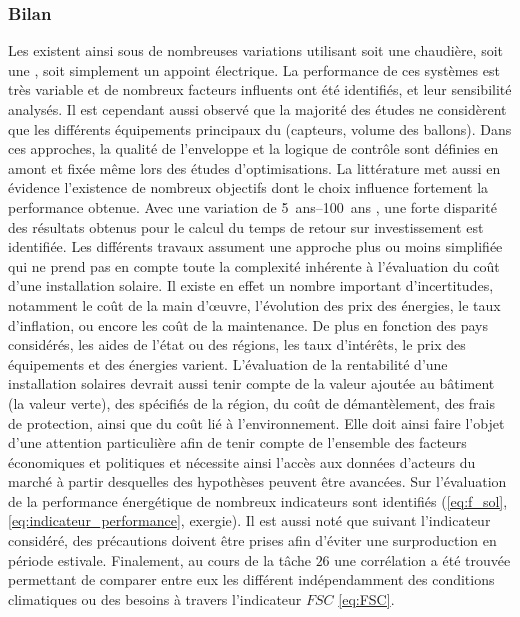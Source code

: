 \subsubsection{Bilan} %
\label{ssub:bilan_travaux}
Les  existent ainsi sous de nombreuses variations utilisant soit une chaudière,
soit une , soit simplement un appoint électrique. La performance de ces systèmes
est très variable et de nombreux facteurs influents ont été identifiés, et leur
sensibilité analysés. Il est cependant aussi observé que la majorité des études ne
considèrent que les différents équipements principaux du  (capteurs, volume des
ballons). Dans ces approches, la qualité de l’enveloppe et la logique de contrôle sont
définies en amont et fixée même lors des études d’optimisations. La littérature met aussi
en évidence l’existence de nombreux objectifs dont le choix influence fortement la
performance obtenue. Avec une variation de \SIrange{5}{100}{ans}
\parencite{Tsalikis2015743,Hin2014102}, une forte disparité des résultats obtenus pour le
calcul du temps de retour sur investissement est identifiée. Les différents travaux
assument une approche plus ou moins simplifiée qui ne prend pas en compte toute
la complexité inhérente à l’évaluation du coût d’une installation solaire. Il existe en
effet un nombre important d’incertitudes, notamment le coût de la main
d’œuvre, l’évolution des prix des énergies, le taux d’inflation, ou encore les coût de la
maintenance. De plus en fonction des pays considérés, les aides de l’état ou des régions,
les taux d’intérêts, le prix des équipements et des énergies varient. L’évaluation de la
rentabilité d’une installation solaires devrait aussi tenir compte de la valeur ajoutée au
bâtiment (la valeur verte), des spécifiés de la région, du coût de démantèlement, des
frais de protection, ainsi que du coût lié à l’environnement. Elle doit ainsi faire l’objet
d’une attention particulière afin de tenir compte de
l’ensemble des facteurs économiques et politiques et nécessite ainsi l’accès aux données
d’acteurs du marché à partir desquelles des hypothèses peuvent être avancées. Sur
l’évaluation de la performance énergétique de nombreux indicateurs sont identifiés
(\eqref{eq:f_sol}, \eqref{eq:indicateur_performance}, exergie). Il est aussi noté que
suivant l’indicateur considéré, des précautions doivent être prises afin d’éviter une
surproduction en période estivale. Finalement, au cours de la tâche $26$ une corrélation a
été trouvée permettant de comparer entre eux les différent  indépendamment des
conditions climatiques ou des besoins à travers l’indicateur $FSC$ \eqref{eq:FSC}.

